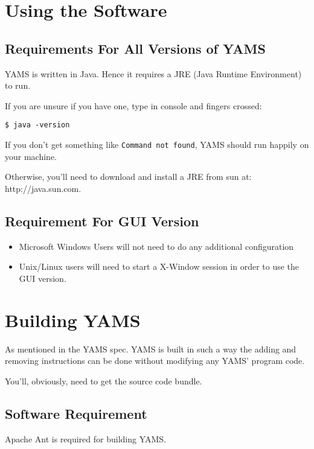 \documentclass[12pt]{report}
\begin{document}
\chapter{Using the Software}

\section{Requirements For All Versions of YAMS}

YAMS is written in Java. Hence it requires a JRE (Java Runtime
Environment) to run.

If you are unsure if you have one, type in console and fingers
crossed:

\texttt{\$ java -version}

If you don't get something like \texttt{Command not found}, YAMS
should run happily on your machine.

Otherwise, you'll need to download and install a JRE from sun at:
http://java.sun.com.

\section{Requirement For GUI Version}

\begin{itemize}

\item Microsoft Windows Users will not need to do any additional
configuration

\item Unix/Linux users will need to start a X-Window session in
order to use the GUI version.

\end{itemize}

\chapter{Building YAMS}

As mentioned in the YAMS spec. YAMS is built in such a way the
adding and removing instructions can be done without modifying any
YAMS' program code.

You'll, obviously, need to get the source code bundle.

\section{Software Requirement}

Apache Ant is required for building YAMS.
\end{document}
